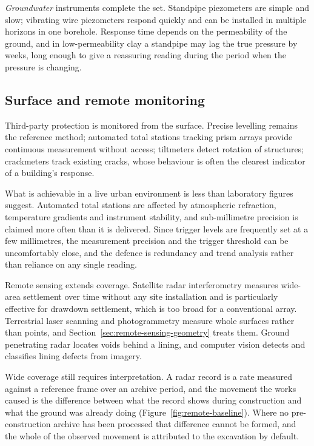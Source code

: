 \emph{Groundwater} instruments complete the set. Standpipe piezometers are
simple and slow; vibrating wire piezometers respond quickly and can be
installed in multiple horizons in one borehole. Response time depends on the
permeability of the ground, and in low-permeability clay a standpipe may lag
the true pressure by weeks, long enough to give a reassuring reading during
the period when the pressure is changing.

\subsection{Surface and remote monitoring}
\label{sec:surface-remote}

Third-party protection is monitored from the surface. Precise levelling
remains the reference method; automated total stations tracking prism arrays
provide continuous measurement without access; tiltmeters detect rotation of
structures; crackmeters track existing cracks, whose behaviour is often the
clearest indicator of a building's response.

What is achievable in a live urban environment is less than laboratory figures
suggest. Automated total stations are affected by atmospheric refraction,
temperature gradients and instrument stability, and sub-millimetre precision
is claimed more often than it is delivered. Since trigger levels are
frequently set at a few millimetres, the measurement precision and the trigger
threshold can be uncomfortably close, and the defence is redundancy and
trend analysis rather than reliance on any single reading.

Remote sensing extends coverage. Satellite radar interferometry measures
wide-area settlement over time without any site installation and is
particularly effective for drawdown settlement, which is too broad for a
conventional array. Terrestrial laser scanning and photogrammetry measure
whole surfaces rather than points, and
Section~\ref{sec:remote-sensing-geometry} treats them. Ground
penetrating radar locates voids behind a lining, and computer vision detects
and classifies lining defects from imagery.

Wide coverage still requires interpretation. A radar record is a rate
measured against a reference frame over an archive period, and the movement the
works caused is the difference between what the record shows during
construction and what the ground was already doing
(Figure~\ref{fig:remote-baseline}). Where no pre-construction archive has been
processed that difference cannot be formed, and the whole of the observed
movement is attributed to the excavation by default.


